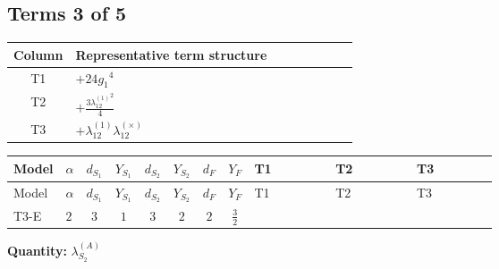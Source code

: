 \documentclass[8pt]{article}
\begin{document}
\begin{landscape}
\subsection*{Terms 3 of 5}
\begin{center}
\begin{tabular}{@{}c >{\raggedright\arraybackslash}p{0.82\linewidth}@{}}
\toprule
Column & Representative term structure \\
\midrule
T1 & \(\displaystyle +24 {g_1}^4\) \\
\midrule
T2 & \(\displaystyle +\frac{3 {\lambda_{12}^{(1)}}^2}{4}\) \\
\midrule
T3 & \(\displaystyle +{\lambda_{12}^{(1)}} {\lambda_{12}^{(\times)}}\) \\
\midrule
\bottomrule
\end{tabular}
\end{center}
\smallskip
\tiny
\begin{longtable}{@{}llcccccc >{\raggedright\arraybackslash}p{0.21\linewidth} >{\raggedright\arraybackslash}p{0.21\linewidth} >{\raggedright\arraybackslash}p{0.21\linewidth}@{}}
\toprule
Model & $\alpha$ & $d_{S_1}$ & $Y_{S_1}$ & $d_{S_2}$ & $Y_{S_2}$ & $d_F$ & $Y_F$ & T1 & T2 & T3 \\
\midrule
\endfirsthead
\toprule
Model & $\alpha$ & $d_{S_1}$ & $Y_{S_1}$ & $d_{S_2}$ & $Y_{S_2}$ & $d_F$ & $Y_F$ & T1 & T2 & T3 \\
\midrule
\endhead
T3-E & $2$ & $3$ & $1$ & $3$ & $2$ & $2$ & $\frac{3}{2}$ & \scriptsize\adjustbox{max width=\linewidth}{$\begin{gathered} +24 {g_1}^4\end{gathered}$} & \scriptsize\adjustbox{max width=\linewidth}{$\begin{gathered} +\frac{3 {\lambda_{12}^{(1)}}^2}{4}\end{gathered}$} & \scriptsize\adjustbox{max width=\linewidth}{$\begin{gathered} +{\lambda_{12}^{(1)}} {\lambda_{12}^{(\times)}}\end{gathered}$} \\
\midrule
\bottomrule
\end{longtable}
\clearpage
\noindent\textbf{Quantity: }$\lambda_{S_2}^{(A)}$\par\smallskip

\end{landscape}
\end{document}
